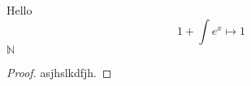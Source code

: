 \documentclass[10pt]{article}
\begin{document}
Hello 
$$1+\int e^x \mapsto 1$$ 
$\mathbb{N}$
\begin{proof}
asjhslkdfjh.
\end{proof}
\end{document}
